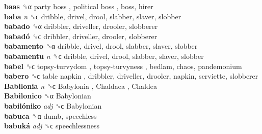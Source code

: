 \textbf{baas} ␝α   party boss ,  political boss , boss, hirer  \\
\textbf{baba} \emph{n}  ␝ϲ  dribble, drivel, drool, slabber, slaver, slobber  \\
\textbf{babado} ␝α  dribbler, driveller, drooler, slobberer  \\
\textbf{babadó} ␝ϲ  dribbler, driveller, drooler, slobberer  \\
\textbf{babamento} ␝α  dribble, drivel, drool, slabber, slaver, slobber  \\
\textbf{babamentu} \emph{n}  ␝ϲ  dribble, drivel, drool, slabber, slaver, slobber  \\
\textbf{babel} ␝ϲ   topsy-turvydom ,  topsy-turvyness , bedlam, chaos, pandemonium  \\
\textbf{babero} ␝ϲ   table napkin , dribbler, driveller, drooler, napkin, serviette, slobberer  \\
\textbf{Babilonia} \emph{n}  ␝ϲ   Babylonia ,  Chaldaea ,  Chaldea   \\
\textbf{Babilonico} ␝α   Babylonian   \\
\textbf{babilóniko} \emph{adj}  ␝ϲ   Babylonian   \\
\textbf{babuca} ␝α  dumb, speechless  \\
\textbf{babuká} \emph{adj}  ␝ϲ  speechlessness  \\

